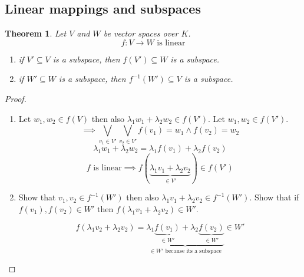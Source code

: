 \documentclass[a4paper,landscape,twocolumn]{article}
\newtheorem{theorem}{Theorem}[section]
\begin{document}
\subsection{Linear mappings and subspaces}
\begin{theorem}
  \label{satz-5-11}
  Let $V$ and $W$ be vector spaces over $K$.
  \[ f: V \rightarrow W \text{ is linear} \]
  \begin{enumerate}
    \item if $V' \subseteq V$ is a subspace, then $f(V') \subseteq W$ is a subspace.
    \item if $W' \subseteq W$ is a subspace, then $f^{-1}(W') \subseteq V$ is a subspace.
  \end{enumerate}
\end{theorem}
\begin{proof}
  \begin{enumerate}
    \item
      Let $w_1, w_2 \in f(V)$ then also $\lambda_1 w_1 + \lambda_2 w_2 \in f(V')$.
      Let $w_1, w_2 \in f(V')$.
      \[
        \implies \bigvee_{v_1 \in V'} \bigvee_{v_2 \in V'}
        f(v_1) = w_1 \land f(v_2) = w_2
      \]
      \[ \lambda_1 w_1 + \lambda_2 w_2 = \lambda_1 f(v_1) + \lambda_2 f(v_2) \]
      \[ f \text{ is linear} \implies f(\underbrace{\lambda_1 v_1 + \lambda_2 v_2}_{\in V'}) \in f(V') \]
    \item Show that $v_1, v_2 \in f^{-1}(W')$ then also $\lambda_1 v_1 + \lambda_2 v_2 \in f^{-1}(W')$.
      Show that if $f(v_1), f(v_2) \in W'$ then $f(\lambda_1 v_1 + \lambda_2 v_2) \in W'$.

      \[
        f(\lambda_1 v_2 + \lambda_2 v_2)
        = \underbrace{\lambda_1 \underbrace{f(v_1)}_{\in W'} + \lambda_2 \underbrace{f(v_2)}_{\in W'}}_{\in W' \text{ because its a subspace}} \in W'
      \]
  \end{enumerate}
\end{proof}
\end{document}
